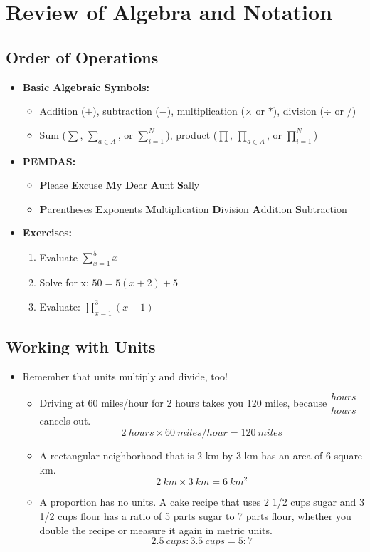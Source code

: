 \documentclass[11pt]{article}
\theoremstyle{definition}
\theoremstyle{remark}
\begin{document}
\section{Review of Algebra and Notation}


\subsection{Order of Operations}
\begin{itemize}
\item \textbf{Basic Algebraic Symbols:}
\begin{itemize}
\item Addition ($+$), subtraction ($-$), multiplication ($\times$ or $*$), division ($\div $ or $/ $)
\item Sum ($\sum $, $\sum\limits_{a \in A} $, or  $\sum\limits_{i=1}^N$), product ($\prod $,  $\prod\limits_{a\in A} $,  or $\prod \limits_{i=1}^N$)

\end{itemize}
\item \textbf{PEMDAS:}
\begin{itemize}
\item \textbf{P}lease \textbf{E}xcuse \textbf{M}y \textbf{D}ear \textbf{A}unt \textbf{S}ally 
\item \textbf{P}arentheses \textbf{E}xponents \textbf{M}ultiplication \textbf{D}ivision \textbf{A}ddition \textbf{S}ubtraction
\end{itemize}
\item \textbf{Exercises:} 
\begin{enumerate}
\item Evaluate $\sum\limits_{x=1}^5 x$
\item Solve for x: $50 = 5(x+2) + 5$
\item Evaluate: $\displaystyle \prod_{x=1}^3 (x-1)$
\end{enumerate}
 \end{itemize}
\subsection{Working with Units}
\begin{itemize}

\item Remember that units multiply and divide, too!
\begin{itemize}
\item Driving at 60 miles/hour for 2 hours takes you 120 miles, because  $\dfrac{hours}{hours}$ cancels out.
$$ 2~hours \times 60~miles/hour = 120~miles$$
\item A rectangular neighborhood that is 2 km by 3 km has an area of 6 square km.\\ 
$$2~km \times 3~km = 6~km^2$$
\item A proportion has no units. A cake recipe that uses 2 1/2 cups sugar and 3 1/2 cups flour has a ratio of 5 parts sugar to 7 parts flour, whether you double the recipe or measure it again in metric units. 
$$2.5~cups:3.5~cups = 5:7$$
\end{itemize}
\end{itemize}
\end{document}
